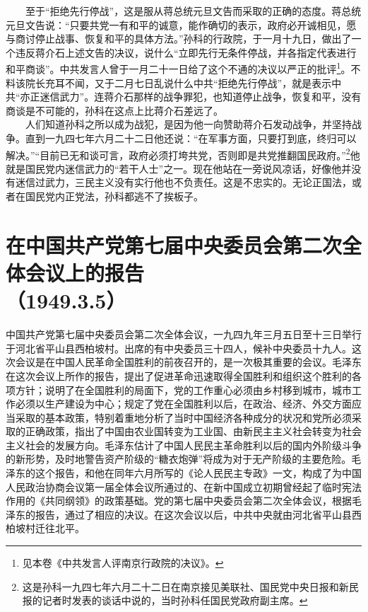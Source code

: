 \documentclass[cn,11pt,chinese]{elegantbook}
\def\myformat#1{\hfil\hfil #1}
\begin{document}
　　至于“拒绝先行停战”，这是服从蒋总统元旦文告而采取的正确的态度。蒋总统元旦文告说：“只要共党一有和平的诚意，能作确切的表示，政府必开诚相见，愿与商讨停止战事、恢复和平的具体方法。”孙科的行政院，于一月十九日，做出了一个违反蒋介石上述文告的决议，说什么“立即先行无条件停战，并各指定代表进行和平商谈”。中共发言人曾于一月二十一日给了这个不通的决议以严正的批评\footnote[4]{ 见本卷《中共发言人评南京行政院的决议》。}。不料该院长充耳不闻，又于二月七日乱说什么中共“拒绝先行停战”，就是表示中共“亦正迷信武力”。连蒋介石那样的战争罪犯，也知道停止战争，恢复和平，没有商谈是不可能的，孙科在这点上比蒋介石差远了。\\
　　人们知道孙科之所以成为战犯，是因为他一向赞助蒋介石发动战争，并坚持战争。直到一九四七年六月二十二日他还说：“在军事方面，只要打到底，终归可以解决。”“目前已无和谈可言，政府必须打垮共党，否则即是共党推翻国民政府。”\footnote[5]{ 这是孙科一九四七年六月二十二日在南京接见美联社、国民党中央日报和新民报的记者时发表的谈话中说的，当时孙科任国民党政府副主席。}他就是国民党内迷信武力的“若干人士”之一。现在他站在一旁说风凉话，好像他并没有迷信过武力，三民主义没有实行他也不负责任。这是不忠实的。无论正国法，或者在国民党内正党法，孙科都逃不了挨板子。\\
\newpage\section*{\myformat{在中国共产党第七届中央委员会第二次全体会议上的报告}\\\myformat{（1949.3.5）}}
\begin{introduction}
\item 中国共产党第七届中央委员会第二次全体会议，一九四九年三月五日至十三日举行于河北省平山县西柏坡村。出席的有中央委员三十四人，候补中央委员十九人。这次会议是在中国人民革命全国胜利的前夜召开的，是一次极其重要的会议。毛泽东在这次会议上所作的报告，提出了促进革命迅速取得全国胜利和组织这个胜利的各项方针；说明了在全国胜利的局面下，党的工作重心必须由乡村移到城市，城市工作必须以生产建设为中心；规定了党在全国胜利以后，在政治、经济、外交方面应当采取的基本政策，特别着重地分析了当时中国经济各种成分的状况和党所必须采取的正确政策，指出了中国由农业国转变为工业国、由新民主主义社会转变为社会主义社会的发展方向。毛泽东估计了中国人民民主革命胜利以后的国内外阶级斗争的新形势，及时地警告资产阶级的“糖衣炮弹”将成为对于无产阶级的主要危险。毛泽东的这个报告，和他在同年六月所写的《论人民民主专政》一文，构成了为中国人民政治协商会议第一届全体会议所通过的、在新中国成立初期曾经起了临时宪法作用的《共同纲领》的政策基础。党的第七届中央委员会第二次全体会议，根据毛泽东的报告，通过了相应的决议。在这次会议以后，中共中央就由河北省平山县西柏坡村迁往北平。
\end{introduction}
\end{document}
